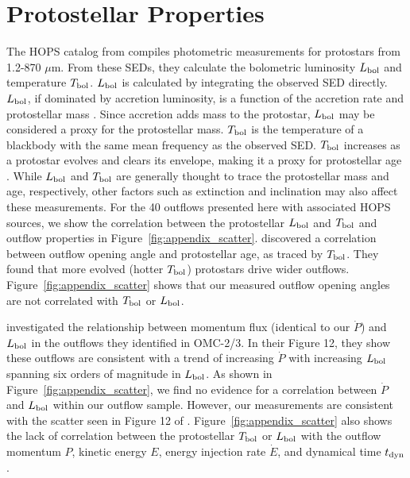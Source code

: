 \documentclass[twocolumn]{aastex63}
\begin{document}
\appendix
\section{Protostellar Properties}
The HOPS catalog from \citet{Furlan16} compiles photometric measurements for protostars from 1.2-870 $\mu$m. From these SEDs, they calculate the bolometric luminosity $L_{\rm bol}$ and temperature $T_{\rm bol}$. $L_{\rm bol}$ is calculated by integrating the observed SED directly. $L_{\rm bol}$, if dominated by accretion luminosity, is a function of the accretion rate and protostellar mass \citep{Takahashi08}. Since accretion adds mass to the protostar, $L_{\rm bol}$ may be considered a proxy for the protostellar mass. $T_{\rm bol}$ is the temperature of a blackbody with the same mean frequency as the observed SED. $T_{\rm bol}$ increases as a protostar evolves and clears its envelope, making it a proxy for protostellar age \citep{Myers93}. While $L_{\rm bol}$ and $T_{\rm bol}$ are generally thought to trace the protostellar mass and age, respectively, other factors such as extinction and inclination may also affect these measurements. For the 40 outflows presented here with associated HOPS sources, we show the correlation between the protostellar $L_{\rm bol}$ and $T_{\rm bol}$ and outflow properties in Figure~\ref{fig:appendix_scatter}. \citet{Arce06} discovered a correlation between outflow opening angle and protostellar age, as traced by $T_{\rm bol}$. They found that more evolved (hotter $T_{\rm bol}$) protostars drive wider outflows. Figure~\ref{fig:appendix_scatter} shows that our measured outflow opening angles are not correlated with $T_{\rm bol}$ or $L_{\rm bol}$.

\citet{Takahashi08} investigated the relationship between momentum flux (identical to our $\dot P$) and $L_{\rm bol}$ in the outflows they identified in OMC-2/3. In their Figure 12, they show these outflows are consistent with a trend of increasing $\dot P$ with increasing $L_{\rm bol}$ spanning six orders of magnitude in $L_{\rm bol}$. As shown in Figure~\ref{fig:appendix_scatter}, we find no evidence for a correlation between $\dot P$ and $L_{\rm bol}$ within our outflow sample. However, our measurements are consistent with the scatter seen in Figure 12 of \citet{Takahashi08}. Figure~\ref{fig:appendix_scatter} also shows the lack of correlation between the protostellar $T_{\rm bol}$ or $L_{\rm bol}$ with the outflow momentum $P$, kinetic energy $E$, energy injection rate $\dot E$, and dynamical time $t_{\rm dyn}$.
\end{document}
